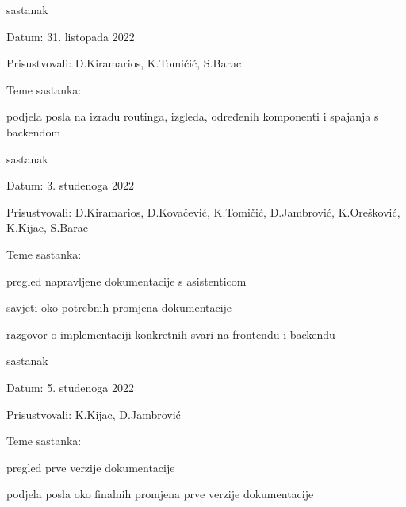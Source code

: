\begin{packed_enum}
			\item  sastanak
			\item[] \begin{packed_item}
				\item Datum: 31. listopada 2022
				\item Prisustvovali: D.Kiramarios, K.Tomičić, S.Barac
				\item Teme sastanka:
				\begin{packed_item}
					\item  podjela posla na izradu routinga, izgleda, određenih komponenti i spajanja s backendom
				\end{packed_item}
			\end{packed_item}

			\item  sastanak
			\item[] \begin{packed_item}
				\item Datum: 3. studenoga 2022
				\item Prisustvovali: D.Kiramarios, D.Kovačević, K.Tomičić, D.Jambrović, K.Orešković, K.Kijac, S.Barac
				\item Teme sastanka:
				\begin{packed_item}
					\item pregled napravljene dokumentacije s asistenticom
					\item savjeti oko potrebnih promjena dokumentacije
					\item razgovor o implementaciji konkretnih svari na frontendu i backendu
				\end{packed_item}
			\end{packed_item}

			\eject

			\item  sastanak
			\item[] \begin{packed_item}
				\item Datum: 5. studenoga 2022
				\item Prisustvovali: K.Kijac, D.Jambrović
				\item Teme sastanka:
				\begin{packed_item}
					\item pregled prve verzije dokumentacije
					\item podjela posla oko finalnih promjena prve verzije dokumentacije
				\end{packed_item}
			\end{packed_item}


\end{packed_enum}
